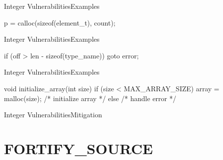 \begin{slide}{Integer Vulnerabilities}{Examples}
  \begin{nicscolumn}
    \begin{nicscode}
      p = calloc(sizeof(element_t), count);
    \end{nicscode}
  \end{nicscolumn}
\end{slide}

\begin{slide}{Integer Vulnerabilities}{Examples}
  \begin{nicscolumn}
    \begin{nicscode}
      if (off > len - sizeof(type_name)) goto error;
    \end{nicscode}
  \end{nicscolumn}
\end{slide}

\begin{slide}{Integer Vulnerabilities}{Examples}
  \begin{nicscolumn}
    \begin{nicsextern}[height=4cm]{}
      void initialize_array(int size) {
        if (size < MAX_ARRAY_SIZE) {
          array = malloc(size);
          /* initialize array */
        } else {
          /* handle error */
        }
      }
    \end{nicsextern}
  \end{nicscolumn}
\end{slide}

\begin{slide}{Integer Vulnerabilities}{Mitigation}
  \begin{nicscolumn}
    \begin{nicsindent}
    \end{nicsindent}
    \begin{nicsindent}
    \end{nicsindent}
  \end{nicscolumn}
\end{slide}

\section{FORTIFY_SOURCE}

